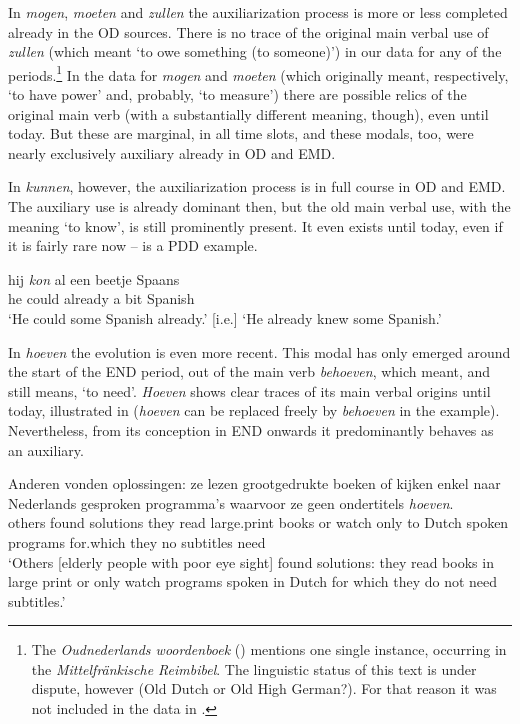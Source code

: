 \documentclass[output=paper]{langsci/langscibook}
\begin{document}
In \textit{mogen}, \textit{moeten} and \textit{zullen} the auxiliarization process is more or less completed already in the OD sources. There is no trace of the original main verbal use of \textit{zullen} (which meant ‘to owe something (to someone)’) in our data for any of the periods.\footnote{The \textit{Oudnederlands woordenboek} (\citeyear{Oudnederlandswoordenboek2012}) mentions one single instance, occurring in the \textit{Mittelfränkische Reimbibel}. The linguistic status of this text is under dispute, however (Old Dutch or Old High German?). For that reason it was not included in the data in \citet{NuytsEtAlinPrep}.}  In the data for \textit{mogen} and \textit{moeten} (which originally meant, respectively, ‘to have power’ and, probably, ‘to measure’) there are possible relics of the original main verb (with a substantially different meaning, though), even until today. But these are marginal, in all time slots, and these modals, too, were nearly exclusively auxiliary already in OD and EMD.

In \textit{kunnen}, however, the auxiliarization process is in full course in OD and EMD. The auxiliary use is already dominant then, but the old main verbal use, with the meaning ‘to know’, is still prominently present. It even exists until today, even if it is fairly rare now –  is a PDD example.

\ea
    \label{ex:nuyts:1}
    \gll hij \textit{kon} al een beetje Spaans \\
       he could already a bit Spanish   \\
    \glt [lit.] `He could some Spanish already.' [i.e.] `He already knew some Spanish.'
    \z

In \textit{hoeven} the evolution is even more recent. This modal has only emerged around the start of the END period, out of the main verb \textit{behoeven}, which meant, and still means, ‘to need’. \textit{Hoeven} shows clear traces of its main verbal origins until today, illustrated in  (\textit{hoeven} can be replaced freely by \textit{behoeven} in the example). Nevertheless, from its conception in END onwards it predominantly behaves as an auxiliary.

\ea
    \label{ex:nuyts:2}
    \gll Anderen vonden oplossingen: ze lezen grootgedrukte boeken of kijken enkel naar Nederlands gesproken programma's waarvoor ze geen ondertitels \textit{hoeven}. \\
 others found solutions they read large.print books or watch only to Dutch spoken programs for.which they no subtitles need\\
    \glt  `Others [elderly people with poor eye sight] found solutions: they read books in large print or only watch programs spoken in Dutch for which they do not need subtitles.'
\z
\end{document}
